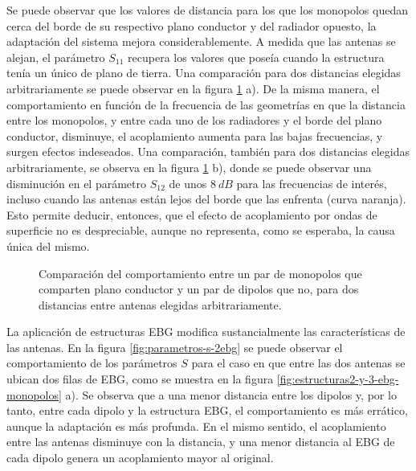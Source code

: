 Se puede observar que los valores de distancia para los que los monopolos quedan cerca del borde de su respectivo plano conductor y del radiador opuesto, la adaptación del sistema mejora considerablemente. A medida que las antenas se alejan, el parámetro $S_{11}$ recupera los valores que poseía cuando la estructura tenía un único de plano de tierra. Una comparación para dos distancias elegidas arbitrariamente se puede observar en la figura \ref{fig:comparacion-monopolos-s-sinGND} a). De la misma manera, el comportamiento en función de la frecuencia de las geometrías en que la distancia entre los monopolos, y entre cada uno de los radiadores y el borde del plano conductor, disminuye, el acoplamiento aumenta para las bajas frecuencias, y surgen efectos indeseados. Una comparación, también para dos distancias elegidas arbitrariamente, se observa en la figura \ref{fig:comparacion-monopolos-s-sinGND} b), donde se puede observar una disminución en el parámetro $S_{12}$ de unos $8\ dB$ para las frecuencias de interés, incluso cuando las antenas están lejos del borde que las enfrenta (curva naranja). Esto permite deducir, entonces, que el efecto de acoplamiento por ondas de superficie no es despreciable, aunque no representa, como se esperaba, la causa única del mismo.


\begin{figure}[h]
	\centering 
	\hspace{0pt}
	\caption{Comparación del comportamiento entre un par de monopolos que comparten plano conductor y un par de dipolos que no, para dos distancias entre antenas elegidas arbitrariamente.}
	\label{fig:comparacion-monopolos-s-sinGND}
\end{figure} 


La aplicación de estructuras EBG modifica sustancialmente las características de las antenas. En la figura \ref{fig:parametros-s-2ebg} se puede observar el comportamiento de los parámetros $S$ para el caso en que entre las dos antenas se ubican dos filas de EBG, como se muestra en la figura \ref{fig:estructuras2-y-3-ebg-monopolos} a). Se observa que a una menor distancia entre los dipolos y, por lo tanto, entre cada dipolo y la estructura EBG, el comportamiento es más errático, aunque la adaptación es más profunda. En el mismo sentido, el acoplamiento entre las antenas disminuye con la distancia, y una menor distancia al EBG de cada dipolo genera un acoplamiento mayor al original.

